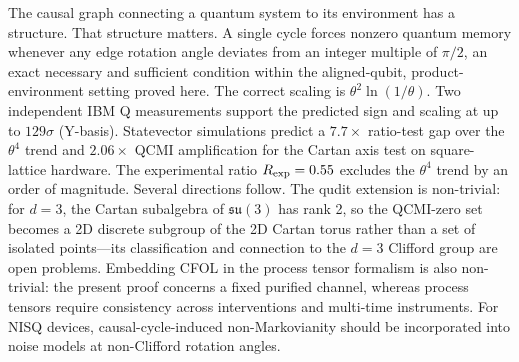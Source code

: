 \documentclass[twocolumn,aps,prl,floatfix]{revtex4-2}
\begin{document}
The causal graph connecting a quantum system to its environment has a structure. That structure matters. A single cycle forces nonzero quantum memory whenever any edge rotation angle deviates from an integer multiple of $\pi/2$, an exact necessary and sufficient condition within the aligned-qubit, product-environment setting proved here. The correct scaling is $\theta^2\ln(1/\theta)$. Two independent IBM Q measurements support the predicted sign and scaling at up to $129\sigma$ (Y-basis). Statevector simulations predict a $7.7\times$ ratio-test gap over the $\theta^4$ trend and $2.06\times$ QCMI amplification for the Cartan axis test on square-lattice hardware. The experimental ratio $R_{\rm exp}=0.55$ excludes the $\theta^4$ trend by an order of magnitude. Several directions follow. The qudit extension is non-trivial: for $d=3$, the Cartan subalgebra of $\mathfrak{su}(3)$ has rank 2, so the QCMI-zero set becomes a 2D discrete subgroup of the 2D Cartan torus rather than a set of isolated points---its classification and connection to the $d=3$ Clifford group are open problems. Embedding CFOL in the process tensor formalism is also non-trivial: the present proof concerns a fixed purified channel, whereas process tensors require consistency across interventions and multi-time instruments. For NISQ devices, causal-cycle-induced non-Markovianity should be incorporated into noise models at non-Clifford rotation angles.
\end{document}
